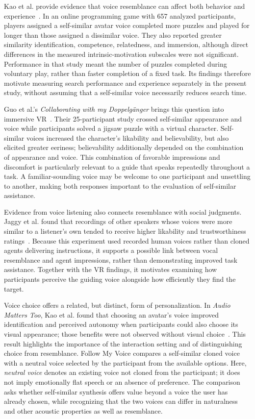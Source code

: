 Kao et al. provide evidence that voice resemblance can affect both behavior and experience~\cite{kao2021selfsimilar}. In an online programming game with 657 analyzed participants, players assigned a self-similar avatar voice completed more puzzles and played for longer than those assigned a dissimilar voice. They also reported greater similarity identification, competence, relatedness, and immersion, although direct differences in the measured intrinsic-motivation subscales were not significant. Performance in that study meant the number of puzzles completed during voluntary play, rather than faster completion of a fixed task. Its findings therefore motivate measuring search performance and experience separately in the present study, without assuming that a self-similar voice necessarily reduces search time.

Guo et al.'s \emph{Collaborating with my Doppelgänger} brings this question into immersive VR~\cite{guo2024doppelganger}. Their 25-participant study crossed self-similar appearance and voice while participants solved a jigsaw puzzle with a virtual character. Self-similar voices increased the character's likability and believability, but also elicited greater eeriness; believability additionally depended on the combination of appearance and voice. This combination of favorable impressions and discomfort is particularly relevant to a guide that speaks repeatedly throughout a task. A familiar-sounding voice may be welcome to one participant and unsettling to another, making both responses important to the evaluation of self-similar assistance.

Evidence from voice listening also connects resemblance with social judgments. Jaggy et al. found that recordings of other speakers whose voices were more similar to a listener's own tended to receive higher likability and trustworthiness ratings~\cite{jaggy2025similarity}. Because this experiment used recorded human voices rather than cloned agents delivering instructions, it supports a possible link between vocal resemblance and agent impressions, rather than demonstrating improved task assistance. Together with the VR findings, it motivates examining how participants perceive the guiding voice alongside how efficiently they find the target.

Voice choice offers a related, but distinct, form of personalization. In \emph{Audio Matters Too}, Kao et al. found that choosing an avatar's voice improved identification and perceived autonomy when participants could also choose its visual appearance; those benefits were not observed without visual choice~\cite{kao2022audiomatters}. This result highlights the importance of the interaction setting and of distinguishing choice from resemblance. Follow My Voice compares a self-similar cloned voice with a neutral voice selected by the participant from the available options. Here, \emph{neutral voice} denotes an existing voice not cloned from the participant; it does not imply emotionally flat speech or an absence of preference. The comparison asks whether self-similar synthesis offers value beyond a voice the user has already chosen, while recognizing that the two voices can differ in naturalness and other acoustic properties as well as resemblance.

